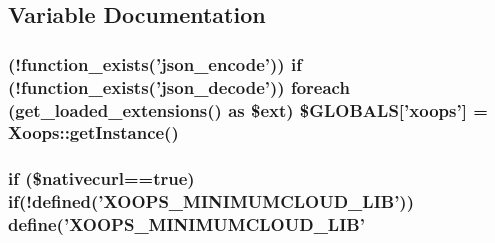 \subsection{Variable Documentation}
\hypertarget{minimumcloud_8php_adf2565575f9f929aa494be5a87b37b20}{
\subsubsection[{\$\-G\-L\-O\-B\-A\-L\-S}]{ (!function\-\_\-exists('json\-\_\-encode')) {\bf if} (!function\-\_\-exists('json\-\_\-decode')) foreach (get\-\_\-loaded\-\_\-extensions() as \$ext) \$G\-L\-O\-B\-A\-L\-S\mbox{[}'xoops'\mbox{]} = Xoops\-::get\-Instance()}}\label{minimumcloud_8php_adf2565575f9f929aa494be5a87b37b20}
\hypertarget{minimumcloud_8php_aa49fda3cc7e19124c0d4107259577ad1}{
\subsubsection[{if}]{\setlength{\rightskip}{0pt plus 5cm}if (\$nativecurl==true) if(!defined('X\-O\-O\-P\-S\-\_\-\-M\-I\-N\-I\-M\-U\-M\-C\-L\-O\-U\-D\-\_\-\-L\-I\-B')) define('X\-O\-O\-P\-S\-\_\-\-M\-I\-N\-I\-M\-U\-M\-C\-L\-O\-U\-D\-\_\-\-L\-I\-B'}}\label{minimumcloud_8php_aa49fda3cc7e19124c0d4107259577ad1}

